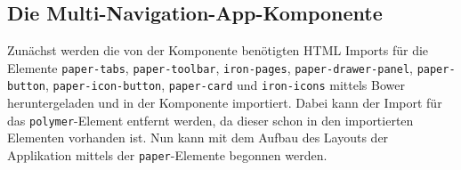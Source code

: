 \subsection{Die Multi-Navigation-App-Komponente}\label{die-multi-navigation-app-komponente}

Zunächst werden die von der Komponente benötigten \ac{HTML} Imports für die Elemente \texttt{paper-tabs}, \texttt{paper-toolbar}, \texttt{iron-pages}, \texttt{paper-drawer-panel}, \texttt{paper-button}, \texttt{paper-icon-button}, \texttt{paper-card} und \texttt{iron-icons} mittels Bower heruntergeladen und in der Komponente importiert. Dabei kann der Import für das \texttt{polymer}-Element entfernt werden, da dieser schon in den importierten Elementen vorhanden ist. Nun kann mit dem Aufbau des Layouts der Applikation mittels der \texttt{paper}-Elemente begonnen werden.

